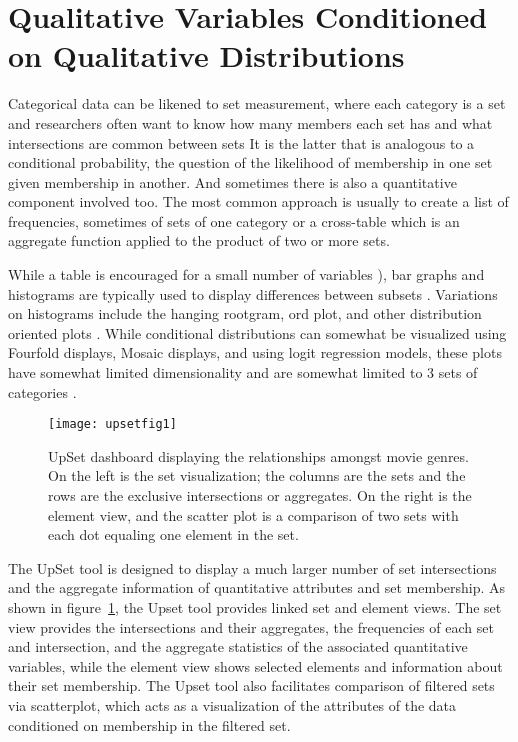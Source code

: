 \documentclass[../main.tex]{subfiles}
\begin{document}
\section{Qualitative Variables Conditioned on Qualitative Distributions}

Categorical data can be likened to set measurement, where each category is a set
and researchers often want to know how many members each set has and what
intersections are common between sets \cite{agresti_categorical_2011,schneider_set-theoretic_2012}
  It is the latter that is analogous to a
conditional probability, the question of the likelihood of membership in one
set given membership in another. And sometimes there is also a quantitative
component involved too. The most common approach is usually to create a list of frequencies, sometimes of sets of one category or a cross-table\cite{goodman_measures_1991} which is an aggregate function applied to the product of two or more sets.

 While a table is encouraged for a small number of variables
 \cite{munzner_what:_2014}), bar graphs and histograms are typically used to display differences between subsets \cite{ioannidis_history_2003-1, friendly_brief_2006}. Variations on histograms
 include the hanging rootgram, ord plot, and other distribution oriented
 plots \cite{tukey_exploratory_1977, friendly_visualizing_2000}. While conditional  distributions can somewhat be visualized using Fourfold displays, Mosaic displays, and using logit regression models, these plots have somewhat limited dimensionality and are somewhat limited to 3 sets of categories
 \cite{friendly_visualizing_2000}. 
   
 
\begin{figure}
  \texttt{[image: upsetfig1]}
   \caption{UpSet dashboard displaying the relationships amongst movie genres. On the left is the set visualization; the columns are the sets and
   the rows are the exclusive intersections or aggregates. On the right is the element view, and the scatter plot is a comparison of two sets with each dot equaling one element in the set.}
   \label{fig:upsetfig}
\end{figure}

The UpSet tool is designed to display a much larger number of set intersections and the aggregate information of quantitative attributes and set membership. \cite{lex_upset:_2014} As shown in figure~\ref{fig:upsetfig}, the Upset tool provides linked set and element views. The set view provides the intersections and their
aggregates, the frequencies of each set and intersection, and the aggregate
statistics of the associated quantitative variables, while the element view shows
selected elements and information about their set membership. The Upset tool
also facilitates comparison of filtered sets via scatterplot, which acts as a
visualization of the attributes of the data conditioned on membership in the
filtered set.  
\end{document}
